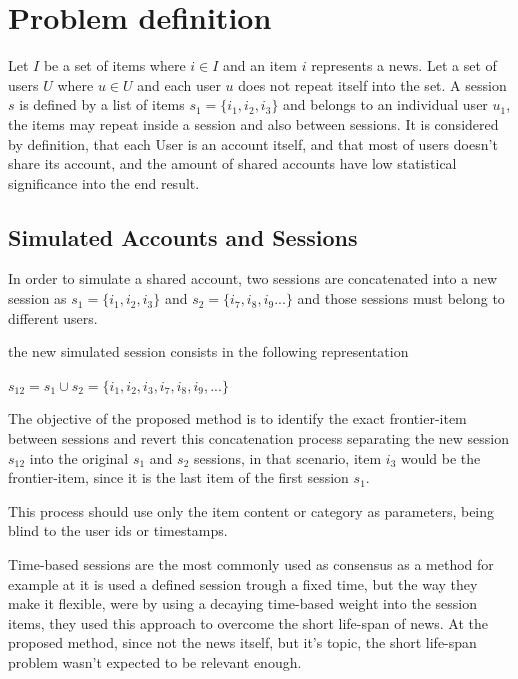 \documentclass[ecp,tc,english]{iiufrgs}
\begin{document}
    \section{Problem definition}
    Let \(I \) be a set of items where \(i \in I \) and an item \(i\) represents a news. Let a set of users \(U\) where \(u \in U \) and each user \(u\) does not repeat itself into the set.
    A session \(s\) is defined by a list of items \(s_{1} = \{i_{1}, i_{2}, i_{3}\}\) and belongs to an individual user \(u_{1}\), the items may repeat inside a session and also between sessions.
    It is considered by definition, that each User is an account itself, and that most of users doesn't share its account, and the amount of shared accounts have low  statistical significance into the end result.
    
        \subsection{Simulated Accounts and Sessions}
        In order to simulate a shared account, two sessions are concatenated into a new session as \(s_{1} = \{i_{1}, i_{2}, i_{3}\}\) and  \(s_{2} = \{i_{7}, i_{8}, i_{9} ...\}\) and those sessions must belong to different users.
    
        the new simulated session consists in the following representation
    
        \(s_{12} =  s_{1} \cup  s_{2} =  \{i_{1}, i_{2}, i_{3}, i_{7}, i_{8}, i_{9}, ...\}\)
    
        The objective of the proposed method is to identify the exact frontier-item between sessions and revert this concatenation process separating the new session  \(s_{12}\) into the original \(s_{1}\) and \(s_{2}\) sessions, in that scenario, item \(i_{3}\) would be the frontier-item, since it is the last item of the first session \(s_{1}\).
    
        This process should use only the item content or category as parameters, being blind to the user ids or timestamps.    
        
        
        
        Time-based sessions are the most commonly used as consensus as a method for example at \cite{10.1145/3184558.3191582} it is used a defined session trough a fixed time, but the way they make it flexible, were by using a decaying time-based weight into the session items, they used this approach to overcome the short life-span of news. At the proposed method, since not the news itself, but it's topic, the short life-span problem wasn't expected to be relevant enough.
    
\end{document}

